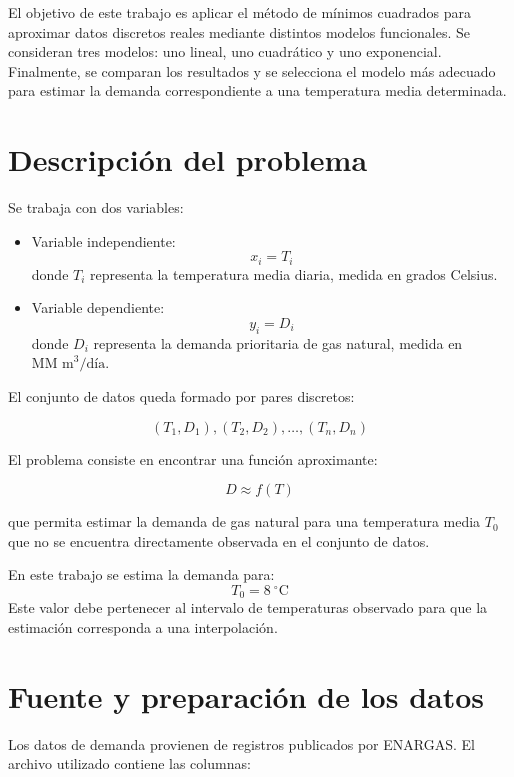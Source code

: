 \documentclass[12pt,a4paper]{article}
\newcommand{\unidadDemanda}{\text{MM m}^3/\text{día}}
\newcommand{\unidadTemp}{^\circ\text{C}}
\begin{document}
El objetivo de este trabajo es aplicar el método de mínimos cuadrados para aproximar datos discretos reales mediante distintos modelos funcionales. Se consideran tres modelos: uno lineal, uno cuadrático y uno exponencial. Finalmente, se comparan los resultados y se selecciona el modelo más adecuado para estimar la demanda correspondiente a una temperatura media determinada.

\section{Descripción del problema}

Se trabaja con dos variables:

\begin{itemize}
    \item Variable independiente:
    \[
        x_i = T_i
    \]
    donde \(T_i\) representa la temperatura media diaria, medida en grados Celsius.

    \item Variable dependiente:
    \[
        y_i = D_i
    \]
    donde \(D_i\) representa la demanda prioritaria de gas natural, medida en \(\unidadDemanda\).
\end{itemize}

El conjunto de datos queda formado por pares discretos:

\[
(T_1,D_1), (T_2,D_2), \dots, (T_n,D_n)
\]

El problema consiste en encontrar una función aproximante:

\[
D \approx f(T)
\]

que permita estimar la demanda de gas natural para una temperatura media \(T_0\) que no se encuentra directamente observada en el conjunto de datos.

\begin{importantbox}
En este trabajo se estima la demanda para:
\[
    T_0 = \boxed{8} \ \unidadTemp
\]
Este valor debe pertenecer al intervalo de temperaturas observado para que la estimación corresponda a una interpolación.
\end{importantbox}

\section{Fuente y preparación de los datos}

Los datos de demanda provienen de registros publicados por ENARGAS. El archivo utilizado contiene las columnas:
\end{document}
